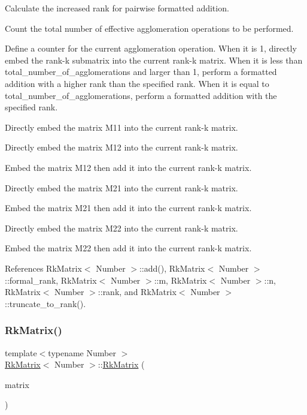 Calculate the increased rank for pairwise formatted addition.

Count the total number of effective agglomeration operations to be performed.

Define a counter for the current agglomeration operation. When it is 1, directly embed the rank-\/k submatrix into the current rank-\/k matrix. When it is less than {\ttfamily total\+\_\+number\+\_\+of\+\_\+agglomerations} and larger than 1, perform a formatted addition with a higher rank than the specified rank. When it is equal to {\ttfamily total\+\_\+number\+\_\+of\+\_\+agglomerations}, perform a formatted addition with the specified rank.

Directly embed the matrix {\ttfamily M11} into the current rank-\/k matrix.

Directly embed the matrix {\ttfamily M12} into the current rank-\/k matrix.

Embed the matrix {\ttfamily M12} then add it into the current rank-\/k matrix.

Directly embed the matrix {\ttfamily M21} into the current rank-\/k matrix.

Embed the matrix {\ttfamily M21} then add it into the current rank-\/k matrix.

Directly embed the matrix {\ttfamily M22} into the current rank-\/k matrix.

Embed the matrix {\ttfamily M22} then add it into the current rank-\/k matrix.

References Rk\+Matrix$<$ Number $>$\+::add(), Rk\+Matrix$<$ Number $>$\+::formal\+\_\+rank, Rk\+Matrix$<$ Number $>$\+::m, Rk\+Matrix$<$ Number $>$\+::n, Rk\+Matrix$<$ Number $>$\+::rank, and Rk\+Matrix$<$ Number $>$\+::truncate\+\_\+to\+\_\+rank().

\mbox{\label{classRkMatrix_a5f886128ba604cc85f99e3c9c9a07e7c}} 
\subsubsection{\texorpdfstring{Rk\+Matrix()}{RkMatrix()}\hspace{0.1cm}{\footnotesize\ttfamily [18/18]}}
{\footnotesize\ttfamily template$<$typename Number $>$ \\
\hyperlink{classRkMatrix}{Rk\+Matrix}$<$ Number $>$\+::\hyperlink{classRkMatrix}{Rk\+Matrix} (\begin{DoxyParamCaption}\item[{const \hyperlink{classRkMatrix}{Rk\+Matrix}$<$ Number $>$ \&}]{matrix }\end{DoxyParamCaption})}

